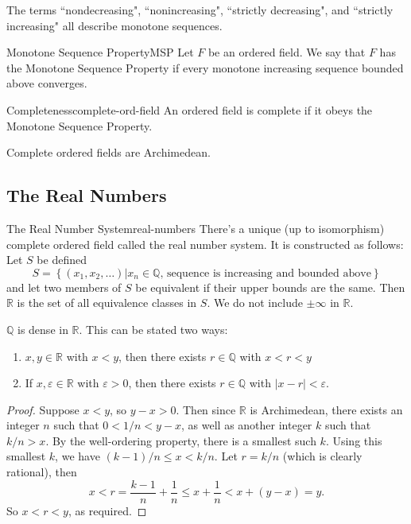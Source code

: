 \documentclass[10pt]{report}
\begin{document}
The terms ``nondecreasing", ``nonincreasing", ``strictly decreasing", and ``strictly increasing" all describe monotone sequences.

\begin{defn}{Monotone Sequence Property}{MSP}
	Let $F$ be an ordered field. We say that $F$ has the Monotone Sequence Property if every monotone increasing sequence bounded above converges.
\end{defn}

\begin{defn}{Completeness}{complete-ord-field}
	An ordered field is complete if it obeys the Monotone Sequence Property.
\end{defn}

Complete ordered fields are Archimedean.

\subsection{The Real Numbers}

\begin{thrm}{The Real Number System}{real-numbers}
	There's a unique (up to isomorphism) complete ordered field called the real number system. It is constructed as follows:
	Let $S$ be defined
	\[
		S = \left\{ (x_1, x_2, \dots) | x_n \in \mathbb{Q} \text{, sequence is increasing and bounded above} \right\}
	\] 
	and let two members of $S$ be equivalent if their upper bounds are the same. Then $\mathbb{R}$ is the set of all equivalence classes in $S$. We do not include $\pm \infty$ in $\mathbb{R}$.
\end{thrm}

\begin{prop}
$\mathbb{Q}$ is dense in $\mathbb{R}$. This can be stated two ways:
\begin{enumerate}
	\item $x,y \in \mathbb{R}$ with $x<y$, then there exists $r \in \mathbb{Q}$ with $x < r < y$
	\item If  $x,\varepsilon \in \mathbb{R}$ with $\varepsilon > 0$, then there exists $r \in \mathbb{Q}$ with $|x-r| < \varepsilon$.
\end{enumerate}
\end{prop}
\begin{proof}
	Suppose $x<y$, so $y-x>0$. Then since $\mathbb{R}$ is Archimedean, there exists an integer $n$ such that $0 < 1/n < y-x$, as well as another integer $k$ such that $k/n > x$. By the well-ordering property, there is a smallest such $k$. Using this smallest $k$, we have $(k-1)/n \leq x < k/n$. Let $r=k/n$ (which is clearly rational), then
	\[
		x < r = \frac{k-1}{n} +\frac{1}{n} \leq x + \frac{1}{n} < x + (y-x) = y.
	\] 
	So $x<r<y$, as required.
\end{proof}
\end{document}
